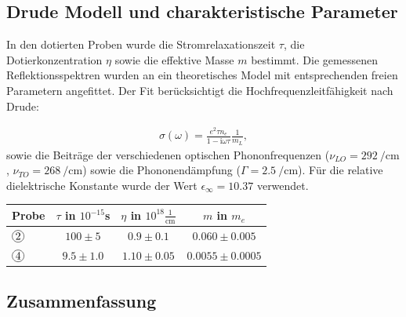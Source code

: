 \documentclass[paper=a4,fontsize=10pt,DIV=18,twocolumn,parskip=half]{scrartcl}
\numberwithin{equation}{section}    %
\begin{document}
\subsection{Drude Modell und charakteristische Parameter}

In den dotierten Proben wurde die Stromrelaxationszeit $\tau$, die 
Dotierkonzentration $\eta$ sowie die effektive Masse $m$ bestimmt. Die 
gemessenen Reflektionsspektren wurden an ein theoretisches Model mit 
entsprechenden freien Parametern angefittet. Der Fit berücksichtigt die 
Hochfrequenzleitfähigkeit nach Drude:

\begin{align}
    \sigma(\omega) = \frac{e^2 \tau n_e}{1-\text{i}\omega\tau} 
    \frac{1}{m_L},
\end{align}
sowie die Beiträge der verschiedenen optischen Phononfrequenzen 
($\nu_{LO}=\SI{292}{\per\centi\meter}$, $\nu_{TO}=\SI{268}{\per\centi\meter}$) 
sowie die Phononendämpfung ($\Gamma=\SI{2.5}{\per\centi\meter}$). Für die 
relative dielektrische Konstante wurde der Wert $\epsilon_{\infty}=10.37$ 
verwendet.

\begin{tabular}{l c c c}
    Probe & $\tau$ in $10^{-15}$s & $\eta$ in $10^{18} \frac{1}{\text{cm}}$ &
   $m$ in $m_e$ \\
   \hline
   $\circled{2}$ & $100\pm5$ & $0.9\pm0.1$ & $0.060\pm0.005$ \\
   $\circled{4}$ & $9.5\pm1.0$ & $1.10\pm0.05$ & $0.0055\pm0.0005$
\end{tabular}





\subsection{Zusammenfassung}
\end{document}
